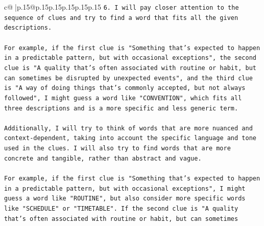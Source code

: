 \documentclass{article}
\begin{document}
{\begin{supertabular}{c@{$\;$}|p{.15\linewidth}@{}p{.15\linewidth}p{.15\linewidth}p{.15\linewidth}p{.15\linewidth}p{.15\linewidth}}
{{{\texttt{6. I will pay closer attention to the sequence of clues and try to find a word that fits all the given descriptions.} \\
\\ 
\texttt{For example, if the first clue is "Something that's expected to happen in a predictable pattern, but with occasional exceptions", the second clue is "A quality that's often associated with routine or habit, but can sometimes be disrupted by unexpected events", and the third clue is "A way of doing things that's commonly accepted, but not always followed", I might guess a word like "CONVENTION", which fits all three descriptions and is a more specific and less generic term.} \\
\\ 
\texttt{Additionally, I will try to think of words that are more nuanced and context{-}dependent, taking into account the specific language and tone used in the clues. I will also try to find words that are more concrete and tangible, rather than abstract and vague.} \\
\\ 
\texttt{For example, if the first clue is "Something that's expected to happen in a predictable pattern, but with occasional exceptions", I might guess a word like "ROUTINE", but also consider more specific words like "SCHEDULE" or "TIMETABLE". If the second clue is "A quality that's often associated with routine or habit, but can sometimes} \\
            }
        }
    }
     \\ \\

\end{supertabular}
}
\end{document}
